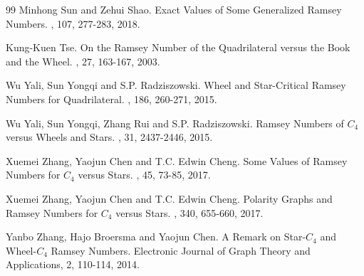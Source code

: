 \documentclass[12]{article}
\begin{document}
\begin{thebibliography}{99}
\newblock Minhong Sun and Zehui Shao.
\newblock Exact Values of Some Generalized Ramsey Numbers.
, 107, 277-283, 2018.

\newblock Kung-Kuen Tse.
\newblock On the Ramsey Number of the Quadrilateral versus the Book and the Wheel.
, 27, 163-167, 2003.

\newblock Wu Yali, Sun Yongqi and S.P. Radziszowski.
\newblock Wheel and Star-Critical Ramsey Numbers for Quadrilateral.
, 186, 260-271, 2015.

\newblock Wu Yali, Sun Yongqi, Zhang Rui and S.P. Radziszowski.
\newblock Ramsey Numbers of $C_4$ versus Wheels and Stars.
, 31, 2437-2446, 2015.

\newblock Xuemei Zhang, Yaojun Chen and T.C. Edwin Cheng.
\newblock Some Values of Ramsey Numbers for $C_4$ versus Stars.
, 45, 73-85, 2017.

\newblock Xuemei Zhang, Yaojun Chen and T.C. Edwin Cheng.
\newblock Polarity Graphs and Ramsey Numbers for $C_4$ versus Stars.
, 340, 655-660, 2017.

\newblock Yanbo Zhang, Hajo Broersma and Yaojun Chen.
\newblock A Remark on Star-$C_4$ and Wheel-$C_4$ Ramsey Numbers.
\newblock Electronic Journal of Graph Theory and Applications, 2, 110-114, 2014.
\end{thebibliography}
\end{document}
